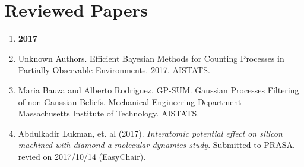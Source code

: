 \documentclass[]{friggeri-cv} %
\begin{document}
%	
%	

\section{Reviewed Papers}
\begin{enumerate}
	
	\item[] {\large \bf 2017}
	
	\item Unknown Authors. Efficient Bayesian Methods for Counting Processes in Partially 
	Observable Environments. 2017. AISTATS.
	
	\item Maria Bauza and Alberto Rodriguez. GP-SUM. Gaussian Processes Filtering of non-Gaussian Beliefs. Mechanical Engineering Department — Massachusetts Institute of Technology. AISTATS.
	
	\item Abdulkadir Lukman, et. al (2017). {\it Interatomic potential effect on silicon machined with diamond-a molecular dynamics study}. Submitted to PRASA. revied on 2017/10/14 (EasyChair).	
\end{enumerate}



\begin{refsection} %
\nocite{*}
\printbibliography[sorting=chronological, type=inproceedings, title={international peer-reviewed conferences/proceedings}, notkeyword={france}, heading=subbibliography]
\end{refsection}
\end{document}

